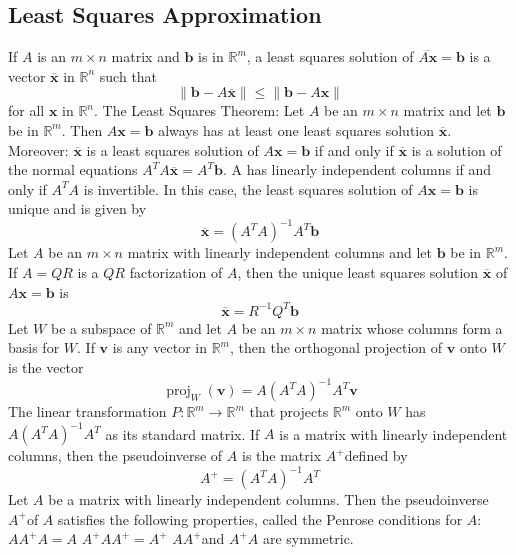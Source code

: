 \documentclass{article}
\begin{document}
        \subsection{Least Squares Approximation} 
        \begin{outline}
            \1 If $A$ is an $m \times n$ matrix and $\mathbf{b}$ is in $\mathbb{R}^{m}$, a least squares solution of $\overline{A \mathbf{x}}=\mathbf{b}$ is a vector $\overline{\mathbf{x}}$ in $\mathbb{R}^{n}$ such that \[\|\mathbf{b}-A \overline{\mathbf{x}}\| \leq\|\mathbf{b}-A \mathbf{x}\|\] for all $\mathbf{x}$ in $\mathbb{R}^{n}$.
            \1 The Least Squares Theorem: Let $A$ be an $m \times n$ matrix and let $\mathbf{b}$ be in $\mathbb{R}^{m}$. Then $A \mathbf{x}=\mathbf{b}$ always has at least one least squares solution $\overline{\mathbf{x}}$. Moreover:
                \2 $\overline{\mathbf{x}}$ is a least squares solution of $A \mathbf{x}=\mathbf{b}$ if and only if $\overline{\mathbf{x}}$ is a solution of the normal equations $A^{T} A \overline{\mathbf{x}}=A^{T} \mathbf{b}$.
                \2 A has linearly independent columns if and only if $A^{T} A$ is invertible. In this case, the least squares solution of $A \mathbf{x}=\mathbf{b}$ is unique and is given by
                \[\overline{\mathbf{x}}=\left(A^{T} A\right)^{-1} A^{T} \mathbf{b}\]
            \1 Let $A$ be an $m \times n$ matrix with linearly independent columns and let $\mathbf{b}$ be in $\mathbb{R}^{m}$. If $A=Q R$ is a $Q R$ factorization of $A$, then the unique least squares solution $\overline{\mathbf{x}}$ of $A \mathbf{x}=\mathbf{b}$ is
            \[\overline{\mathbf{x}}=R^{-1} Q^{T} \mathbf{b}\]
            \1 Let $W$ be a subspace of $\mathbb{R}^{m}$ and let $A$ be an $m \times n$ matrix whose columns form a basis for $W$. If $\mathbf{v}$ is any vector in $\mathbb{R}^{m}$, then the orthogonal projection of $\mathbf{v}$ onto $W$ is the vector
            \[\operatorname{proj}_{W}(\mathbf{v})=A\left(A^{T} A\right)^{-1} A^{T} \mathbf{v}\]
            The linear transformation $P: \mathbb{R}^{m} \rightarrow \mathbb{R}^{m}$ that projects $\mathbb{R}^{m}$ onto $W$ has $A\left(A^{T} A\right)^{-1} A^{T}$ as its standard matrix.
            \1 If $A$ is a matrix with linearly independent columns, then the pseudoinverse of $A$ is the matrix $A^{+}$defined by
            \[A^{+}=\left(A^{T} A\right)^{-1} A^{T}\]
            \1 Let $A$ be a matrix with linearly independent columns. Then the pseudoinverse $A^{+}$of $A$ satisfies the following properties, called the Penrose conditions for $A$:
                \2 $A A^{+} A=A$
                \2 $A^{+} A A^{+}=A^{+}$
                \2 $A A^{+}$and $A^{+} A$ are symmetric.
        \end{outline}
\end{document}
